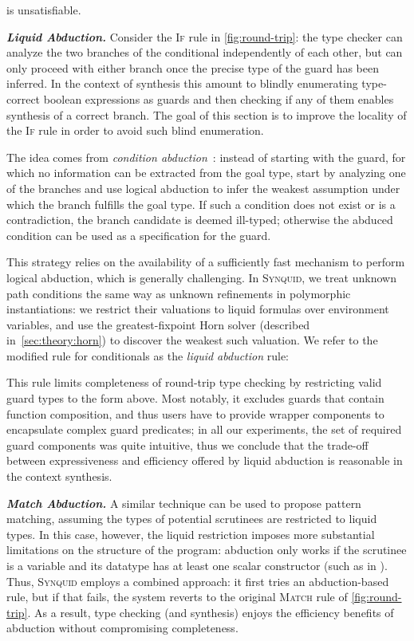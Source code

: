 \documentclass[10pt,preprint]{sigplanconf-pldi16}
\theoremstyle{definition}
\newcommand{\custompar}[1]{\parskip 0pt \textbf{\textit{#1}}}
\newcommand{\lang}{\textsc{Synquid}\xspace}
\begin{document}
is unsatisfiable.


\custompar{Liquid Abduction.}
Consider the \textsc{If} rule in \autoref{fig:round-trip}:
the type checker can analyze the two branches of the conditional independently of each other,
but can only proceed with either branch once the precise type of the guard has been inferred.
In the context of synthesis this amount to blindly enumerating type-correct boolean expressions as guards
and then checking if any of them enables synthesis of a correct branch.
The goal of this section is to improve the locality of the \textsc{If} rule
in order to avoid such blind enumeration.

The idea comes from \emph{condition abduction}~\cite{LeinoMi12,KneussKuKuSu13,AlurCR15}:
instead of starting with the guard, for which no information can be extracted from the goal type,
start by analyzing one of the branches and use logical abduction to infer the weakest assumption under which the branch fulfills the goal type.
If such a condition does not exist or is a contradiction, the branch candidate is deemed ill-typed;
otherwise the abduced condition can be used as a specification for the guard.

This strategy relies on the availability of a sufficiently fast mechanism to perform logical abduction, which is generally challenging.
In \lang, we treat unknown path conditions the same way as unknown refinements in polymorphic instantiations:
we restrict their valuations to liquid formulas over environment variables,
and use the greatest-fixpoint Horn solver (described in~\autoref{sec:theory:horn}) to discover the weakest such valuation.
We refer to the modified rule for conditionals as the \emph{liquid abduction} rule:

This rule limits completeness of round-trip type checking by restricting valid guard types to the form above.
Most notably, it excludes guards that contain function composition,
and thus users have to provide wrapper components to encapsulate complex guard predicates;
in all our experiments, the set of required guard components was quite intuitive,
thus we conclude that the trade-off between expressiveness and efficiency offered by liquid abduction is reasonable in the context synthesis.

\custompar{Match Abduction.}
A similar technique can be used to propose pattern matching,
assuming the types of potential scrutinees are restricted to liquid types.
In this case, however, the liquid restriction imposes more substantial limitations on the structure of the program:
abduction only works if the scrutinee is a variable
and its datatype has at least one scalar constructor (such as  in ).
Thus, \lang employs a combined approach:
it first tries an abduction-based rule, but if that fails, the system reverts to the original \textsc{Match} rule of \autoref{fig:round-trip}.
As a result, type checking (and synthesis) enjoys the efficiency benefits of abduction without compromising completeness.
\end{document}
